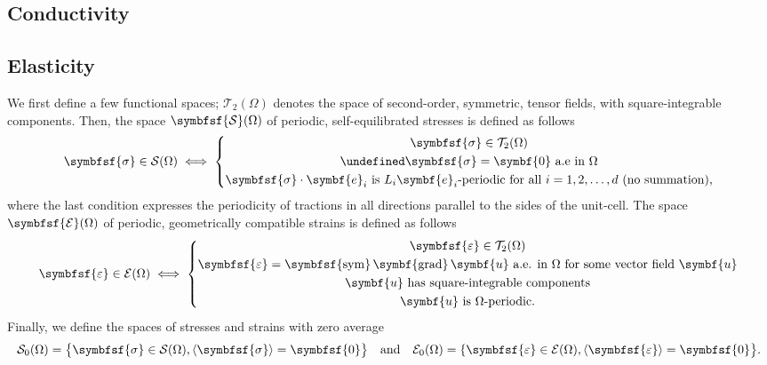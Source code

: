 \documentclass[draft, appendixprefix=true, chapterprefix=true, fontsize=12pt, numbers=noendperiod]{scrbook}
\let\div\undefined
\DeclareMathOperator{\div}{div}
\DeclareMathOperator{\grad}{\symbf{grad}}
\DeclareMathOperator{\sym}{\symbfsf{sym}}
\newcommand{\tens}[1]{\symbfsf{#1}}
\renewcommand{\vec}[1]{\symbf{#1}}
\newcommand{\tensors}{\mathcal T}
\newcommand{\stresses}{\mathcal S}
\newcommand{\strains}{\mathcal E}
\begin{document}
\subsection{Conductivity}

\subsection{Elasticity}

We first define a few functional spaces; \(\tensors_2(\Omega)\) denotes the
space of second-order, symmetric, tensor fields, with square-integrable
components. Then, the space \(\tens\stresses(\Omega)\) of periodic,
self-equilibrated stresses is defined as follows
\begin{equation}
  \label{eq:7}
  \tens\sigma\in\stresses(\Omega)\iff\left\{
  \begin{gathered}
    \tens\sigma\in\tensors_2(\Omega)\\
    \div\tens\sigma=\vec 0\text{ a.e in }\Omega\\
    \tens\sigma\cdot\vec e_i\text{ is }L_i\vec e_i\text{-periodic for all }i=1, 2, \ldots, d\text{ (no summation),}
  \end{gathered}
  \right.
\end{equation}
where the last condition expresses the periodicity of tractions in all
directions parallel to the sides of the unit-cell. The space
\(\tens\strains(\Omega)\) of periodic, geometrically compatible strains is
defined as follows
\begin{equation}
  \label{eq:8}
  \tens\varepsilon\in\strains(\Omega)\iff\left\{
  \begin{gathered}
    \tens\varepsilon\in\tensors_2(\Omega)\\
    \tens\varepsilon=\sym\grad\vec u\text{ a.e. in }\Omega\text{ for some vector
      field }\vec u\\
    \vec u\text{ has square-integrable components}\\
    \vec u\text{ is }\Omega\text{-periodic.}
  \end{gathered}
  \right.
\end{equation}
Finally, we define the spaces of stresses and strains with zero average
\begin{equation}
  \label{eq:9}
  \stresses_0(\Omega)=\bigl\{\tens\sigma\in\stresses(\Omega),
  \langle\tens\sigma\rangle=\tens0\bigr\}
  \quad\text{and}\quad
  \strains_0(\Omega)=\{\tens\varepsilon\in\strains(\Omega),
  \langle\tens\varepsilon\rangle=\tens0\bigr\}.
\end{equation}
\end{document}

